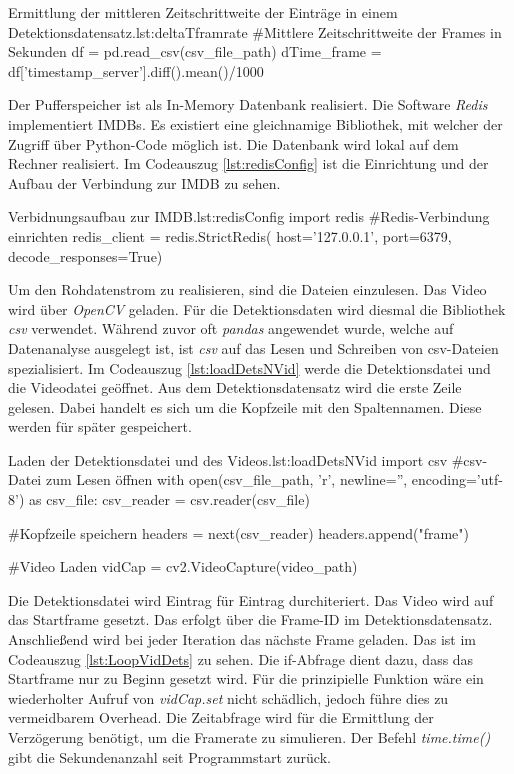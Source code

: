 \begin{pythoncode}{Ermittlung der mittleren Zeitschrittweite der Einträge in einem Detektionsdatensatz.}{lst:deltaTframrate}
#Mittlere Zeitschrittweite der Frames in Sekunden 
df = pd.read_csv(csv_file_path)
dTime_frame = df['timestamp_server'].diff().mean()/1000
\end{pythoncode}

Der Pufferspeicher ist als In-Memory Datenbank realisiert. Die Software \textit{Redis} implementiert IMDBs. Es existiert eine gleichnamige Bibliothek, mit welcher der Zugriff über Python-Code möglich ist. Die Datenbank wird lokal auf dem Rechner realisiert. Im Codeauszug \ref{lst:redisConfig} ist die Einrichtung und der Aufbau der Verbindung zur IMDB zu sehen.

\begin{pythoncode}{Verbidnungsaufbau zur IMDB.}{lst:redisConfig}
import redis
#Redis-Verbindung einrichten
redis_client = redis.StrictRedis(
                    host='127.0.0.1',
                    port=6379,
                    decode_responses=True)
\end{pythoncode}

Um den Rohdatenstrom zu realisieren, sind die Dateien einzulesen. Das Video wird über \textit{OpenCV} geladen. Für die Detektionsdaten wird diesmal die Bibliothek \textit{csv} verwendet. Während zuvor oft \textit{pandas} angewendet wurde, welche auf Datenanalyse ausgelegt ist, ist \textit{csv} auf das Lesen und Schreiben von csv-Dateien spezialisiert. Im Codeauszug \ref{lst:loadDetsNVid} werde die Detektionsdatei und die Videodatei geöffnet. Aus dem Detektionsdatensatz wird die erste Zeile gelesen. Dabei handelt es sich um die Kopfzeile mit den Spaltennamen. Diese werden für später gespeichert. 

\begin{pythoncode}{Laden der Detektionsdatei und des Videos.}{lst:loadDetsNVid}
import csv
#csv-Datei zum Lesen öffnen 
with open(csv_file_path, 'r', newline='', encoding='utf-8') as csv_file:
    csv_reader = csv.reader(csv_file)

    #Kopfzeile speichern
    headers = next(csv_reader)
    headers.append("frame")

    #Video Laden
    vidCap = cv2.VideoCapture(video_path)
\end{pythoncode}

Die Detektionsdatei wird Eintrag für Eintrag durchiteriert. Das Video wird auf das Startframe gesetzt. Das erfolgt über die Frame-ID im Detektionsdatensatz. Anschließend wird bei jeder Iteration das nächste Frame geladen. Das ist im Codeauszug \ref{lst:LoopVidDets} zu sehen. Die if-Abfrage dient dazu, dass das Startframe nur zu Beginn gesetzt wird. Für die prinzipielle Funktion wäre ein wiederholter Aufruf von \textit{vidCap.set} nicht schädlich, jedoch führe dies zu vermeidbarem Overhead. Die Zeitabfrage wird für die Ermittlung der Verzögerung benötigt, um die Framerate zu simulieren. Der Befehl \textit{time.time()} gibt die Sekundenanzahl seit Programmstart zurück.


